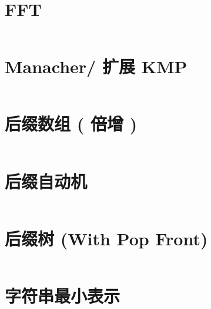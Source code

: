 \documentclass[titlepage,landscape,a4paper,10pt]{article}
\begin{document}
\begin{multicols}{2}
\begin{spacing}{0.8}
\section{FFT}
\inputminted{cpp}{improve/FFT.cpp}



\section{Manacher/ 扩展 KMP}
\inputminted{cpp}{merge/Manacher.cpp}

\section{后缀数组 ( 倍增 )}
\inputminted{cpp}{src/后缀数组(nlogn).cpp}


\section{后缀自动机}
\inputminted{cpp}{src/后缀自动机.cpp}


\section{后缀树 (With Pop Front)}
\inputminted{cpp}{improve/SuffixTree2.cpp}

\section{字符串最小表示}
\inputminted{cpp}{src/字符串最小表示.cpp}


\end{spacing}
\end{multicols}
\end{document}
